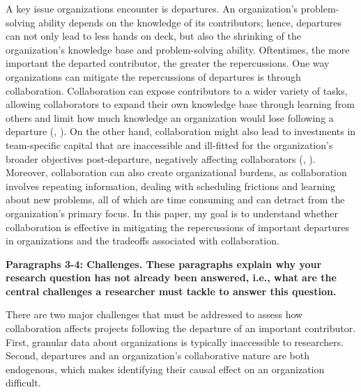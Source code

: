 \documentclass[12pt,notitlepage]{article}
\begin{document}
A key issue organizations encounter is departures. 
An organization's problem-solving ability depends on the knowledge of its contributors; hence, departures can not only lead to less hands on deck, but also the shrinking of the organization's knowledge base and problem-solving ability. Oftentimes, the more important the departed contributor, the greater the repercussions. One way organizations can mitigate the repercussions of departures is through collaboration. Collaboration can expose contributors to a wider variety of tasks, allowing collaborators to expand their own knowledge base through learning from others and limit how much knowledge an organization would lose following a departure (\cite{hamilton_team_2003}, \cite{rashid_systematic_2019}). On the other hand, collaboration might also lead to investments in team-specific capital that are inaccessible and ill-fitted for the organization's broader objectives post-departure, negatively affecting collaborators (\cite{jaravel_team-specific_2018}, \cite{azoulay_does_2019}).  Moreover, collaboration can also create organizational burdens, as collaboration involves repeating information, dealing with scheduling frictions and learning about new problems, all of which are time consuming and can detract from the organization's primary focus.  In this paper, my goal is to understand whether collaboration is effective in mitigating the repercussions of important departures in organizations and the tradeoffs associated with collaboration. 



\textbf{Paragraphs 3-4: Challenges. These paragraphs explain why your research question has not already been answered, i.e., what are the central challenges a researcher must tackle to answer this question.}

There are two major challenges that must be addressed to assess how collaboration affects projects following the departure of an important contributor. First, granular data about organizations is typically inaccessible to researchers. Second, departures and an organization's collaborative nature are both endogenous, which makes identifying their causal effect on an organization difficult. 
\end{document}
